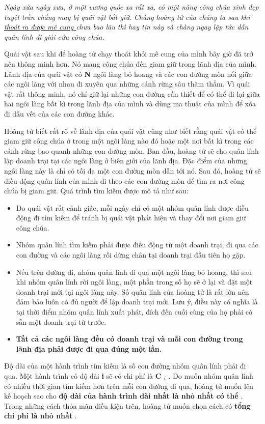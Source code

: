 \emph{Ngày xửa ngày xưa, ở một vương quốc xa rất xa, có một nàng công chúa xinh đẹp tuyệt trần chẳng may bị quái vật bắt giữ. Chàng hoàng tử của chúng ta sau khi \href{vnoi.info/problems/show/VOBOARD2/}{ thoát ra được mê cung } chưa bao lâu thì hay tin này và chàng ngay lập tức dẫn quân lính đi giải cứu công chúa. }

Quái vật sau khi để hoàng tử chạy thoát khỏi mê cung của mình bây giờ đã trở nên thông minh hơn. Nó mang công chúa đến giam giữ trong lãnh địa của mình. Lãnh địa của quái vật có \textbf{ N } ngôi làng bỏ hoang và các con đường mòn nối giữa các ngôi làng với nhau đi xuyên qua những cánh rừng sâu thăm thẳm. Vì quái vật rất thông minh, nó chỉ giữ lại những con đường cần thiết để có thể đi lại giữa hai ngôi làng bất kì trong lãnh địa của mình và dùng ma thuật của mình để xóa đi dấu vết của các con đường khác.

Hoàng tử biết rất rõ về lãnh địa của quái vật cũng như biết rằng quái vật có thể giam giữ công chúa ở trong một ngôi làng nào đó hoặc một nơi bất kì trong các cánh rừng bao quanh những con đường mòn. Ban đầu, hoàng tử sẽ cho quân lính lập doanh trại tại các ngôi làng ở biên giới của lãnh địa. Đặc điểm của những ngôi làng này là chỉ có tối đa một con đường mòn dẫn tới nó. Sau đó, hoàng tử sẽ điều động quân lính của mình đi theo các con đường mòn để tìm ra nơi công chúa bị giam giữ. Quá trình tìm kiếm được mô tả như sau:
\begin{itemize}
	\item Do quái vật rất cảnh giác, mỗi ngày chỉ có một nhóm quân lính được điều động đi tìm kiếm để tránh bị quái vật phát hiện và thay đổi nơi giam giữ công chúa.
	\item Nhóm quân lính tìm kiếm phải được điều động từ một doanh trại, đi qua các con đường và các ngôi làng rồi dừng chân tại doanh trại đầu tiên họ gặp.
	\item Nếu trên đường đi, nhóm quân lính đi qua một ngôi làng bỏ hoang, thì sau khi nhóm quân lính rời ngôi làng, một phần trong số họ sẽ ở lại và đặt một doanh trại mới tại ngôi làng này. Số quân lính của hoàng tử là rất lớn nên đảm bảo luôn có đủ người để lập doanh trại mới. Lưu ý, điều này có nghĩa là tại thời điểm nhóm quân lính xuất phát, đích đến cuối cùng của họ phải có sẵn một doanh trại từ trước.
	\item \textbf{Tất cả các ngôi làng đều có doanh trại và mỗi con đường trong lãnh địa phải được đi qua đúng một lần. }
\end{itemize}

Độ dài của một hành trình tìm kiếm là số con đường nhóm quân lính phải đi qua. Một hành trình có độ dài \textbf{ i } sẽ có chi phí là \textbf{ C $_ i $} . Do muốn nhóm quân lính có nhiều thời gian tìm kiếm hơn trên mỗi con đường đi qua, hoàng tử muốn lên kế hoạch sao cho \textbf{ độ dài của hành trình dài nhất là nhỏ nhất có thể } . Trong những cách thỏa mãn điều kiện trên, hoàng tử muốn chọn cách có \textbf{ tổng chi phí là nhỏ nhất } .